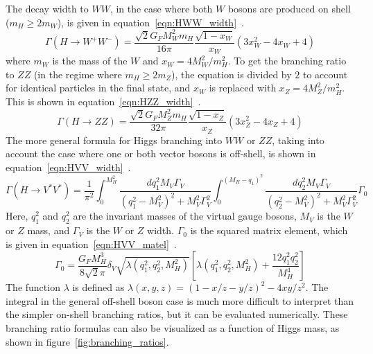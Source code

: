 The decay width to $WW$, in the case where both $W$ bosons are produced on shell ($m_H \geq 2 m_{W}$), is given in equation~\ref{eqn:HWW_width}~\cite{Tully}. 
%
\begin{equation}
\label{eqn:HWW_width}
\Gamma(H\to W^+W^-) = \frac{\sqrt{2} G_F M_W^2 m_H}{16\pi}\frac{\sqrt{1-x_W}}{x_W}\left(3x_W^2 - 4x_W + 4\right)
\end{equation}
%
where $m_W$ is the mass of the $W$ and $x_W  = 4M_W^2/m_H^2$. To get the branching ratio to $ZZ$ (in the regime where $m_H \geq 2 m_{Z}$), the equation is divided by $2$ to account for identical particles in the final state, and $x_W$ is replaced with $x_Z = 4M_Z^2/m_H^2$. This is shown in equation~\ref{eqn:HZZ_width}~\cite{Tully}.
%
\begin{equation}
\label{eqn:HZZ_width}
\Gamma(H\to ZZ) = \frac{\sqrt{2} G_F M_Z^2 m_H}{32\pi}\frac{\sqrt{1-x_Z}}{x_Z}\left(3x_Z^2 - 4x_Z + 4\right)
\end{equation}
%
The more general formula for Higgs branching into $WW$ or $ZZ$, taking into account the case where one or both vector bosons is off-shell, is shown in equation~\ref{eqn:HVV_width}~\cite{DjouadiHiggs}.
%
\begin{equation}
\label{eqn:HVV_width}
\Gamma(H\to V^*V^*) = \frac{1}{\pi^2} \int_{0}^{M_H^2} \frac{dq_1^2 M_V \Gamma_V}{(q_1^2-M_V^2)^2 + M_V^2\Gamma_V^2} \int_0^{(M_H - q_1)^2} \frac{dq_2^2 M_V \Gamma_V}{(q_2^2-M_V^2)^2 + M_V^2\Gamma_V^2} \Gamma_0
\end{equation} 
%
Here, $q_1^2$ and $q_2^2$ are the invariant masses of the virtual gauge bosons, $M_V$ is the $W$ or $Z$ mass, and $\Gamma_V$ is the $W$ or $Z$ width. $\Gamma_0$ is the squared matrix element, which is given in equation~\ref{eqn:HVV_matel}~\cite{DjouadiHiggs}. 
%
\begin{equation}
\label{eqn:HVV_matel}
\Gamma_0 = \frac{G_F M_H^3}{8\sqrt{2}\pi}\delta_V\sqrt{\lambda(q_1^2, q_2^2, M_H^2)}\left[\lambda(q_1^2, q_2^2, M_H^2) + \frac{12 q_1^2 q_2^2}{M_H^4}\right]
\end{equation}
%
The function $\lambda$ is defined as $\lambda(x,y,z) = (1 - x/z - y/z)^2 - 4xy/z^2$. The integral in the general off-shell boson case is much more difficult to interpret than the simpler on-shell branching ratios, but it can be evaluated numerically. These branching ratio formulas can also be visualized as a function of Higgs mass, as shown in figure~\ref{fig:branching_ratios}. 
%

